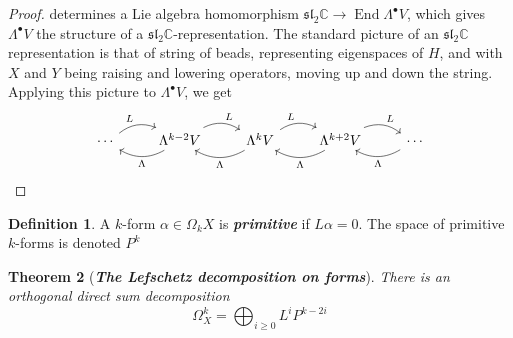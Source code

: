 \documentclass[psamsfonts, 12pt]{amsart}
\newtheorem{thm}{Theorem}[section]
\theoremstyle{definition}
\newtheorem{defn}[thm]{Definition}
\theoremstyle{remark}
\renewcommand{\sl}{\mathfrak{sl}}
\newcommand{\ib}[1]{\textbf{\textit{#1}}}
\newcommand{\C}{\mathbb{C}}
\DeclareMathOperator{\End}{End}
\begin{document}
\begin{proof}
determines a Lie algebra homomorphism $\sl_2\C \to \End\Lambda^\bullet V$, which gives
$\Lambda^\bullet V$ the structure of a $\sl_2\C$-representation. The standard picture
of an $\sl_2\C$ representation is that of string of beads, representing eigenspaces
of $H$, and with $X$ and $Y$ being raising and lowering operators, moving up and
down the string. Applying this picture to $\Lambda^\bullet V$, we get
\[\begin{tikzcd}
\cdots \ar[r, bend left=30, "L"]& \Lambda^{k-2}V \ar[r, bend left=30, "L"]
\ar[l, bend left=30, "\Lambda"] & \Lambda^kV \ar[l, bend left=30, "\Lambda"]
\ar[r, bend left=30, "L"]& \Lambda^{k+2}V \ar[l, bend left=30, "\Lambda"]
\ar[r, bend left=30, "L"]& \cdots \ar[l, bend left=30, "\Lambda"]
\end{tikzcd}\]
\end{proof}
%
\begin{defn}
A $k$-form $\alpha \in \Omega_kX$ is \ib{primitive} if $L\alpha = 0$. The space of
primitive $k$-forms is denoted $P^k$
\end{defn}
%
\begin{thm}[\ib{The Lefschetz decomposition on forms}]
There is an orthogonal direct sum decomposition
\[
\Omega^k_X = \bigoplus_{i \geq 0 } L^iP^{k-2i}
\]
\end{thm}
%
\end{document}
